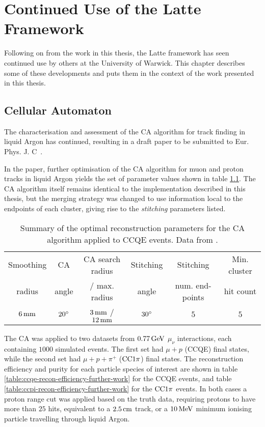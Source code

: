 \chapter{Continued Use of the Latte Framework}\label{appendix:other_uses}

Following on from the work in this thesis, the Latte framework has seen continued use by others at the University of Warwick. This chapter describes some of these developments and puts them in the context of the work presented in this thesis.

\section{Cellular Automaton}
The characterisation and assessment of the \ac{CA} algorithm for track finding in liquid Argon has continued, resulting in a draft paper to be submitted to Eur. Phys. J. C~\citep{Back2013}.

In the paper, further optimisation of the CA algorithm for muon and proton tracks in liquid Argon yields the set of parameter values shown in table \ref{table:opt-params-further-work}. The CA algorithm itself remains identical to the implementation described in this thesis, but the merging strategy was changed to use information local to the endpoints of each cluster, giving rise to the \emph{stitching} parameters listed.

\begin{table}
\centering
\begin{tabular}{*{6}{c}}
Smoothing & CA    & CA search radius & Stitching & Stitching       & Min. cluster \\
radius    & angle & / max. radius    & angle     & num. end-points & hit count \\
\hline
\hline
$6\,\mathrm{mm}$ & $20^\circ$ & $3\,\mathrm{mm}$ / $12\,\mathrm{mm}$ & $30^\circ$ & $5$ & $5$ \\
\hline
\end{tabular}
\caption[CA reconstruction parameters for CCQE events]{\label{table:opt-params-further-work}Summary of the optimal reconstruction parameters for the CA algorithm applied to CCQE events. Data from \cite{Back2013}.}
\end{table}

The CA was applied to two datasets from $0.77\,\mathrm{GeV}$ $\mu_\nu$ interactions, each containing $1000$ simulated events. The first set had $\mu + p$ (CCQE) final states, while the second set had $\mu + p + \pi^+$ ($\mathrm{CC}1\pi$) final states. The reconstruction efficiency and purity for each particle species of interest are shown in table \ref{table:ccqe-recon-efficiency-further-work} for the CCQE events, and table \ref{table:ccpi-recon-efficiency-further-work} for the $\mathrm{CC}1\pi$ events. In both cases a proton range cut was applied based on the truth data, requiring protons to have more than $25$ hits, equivalent to a $2.5\,\mathrm{cm}$ track, or a $10\,\mathrm{MeV}$ minimum ionising particle travelling through liquid Argon.

